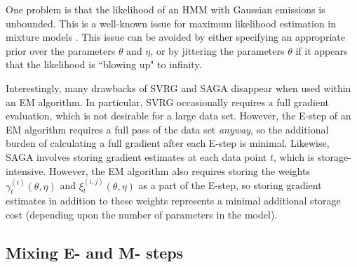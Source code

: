 One problem is that the likelihood of an HMM with Gaussian emissions is unbounded. This is a well-known issue for maximum likelihood estimation in mixture models \citep{Chen:2009,Liu:2015b}. This issue can be avoided by either specifying an appropriate prior over the parameters $\theta$ and $\eta$, or by jittering the parameters $\theta$ if it appears that the likelihood is ``blowing up" to infinity.

Interestingly, many drawbacks of SVRG and SAGA disappear when used within an EM algorithm. In particular, SVRG occasionally requires a full gradient evaluation, which is not desirable for a large data set. However, the E-step of an EM algorithm requires a full pass of the data set \textit{anyway}, so the additional burden of calculating a full gradient after each E-step is minimal. Likewise, SAGA involves storing gradient estimates at each data point $t$, which is storage-intensive. However, the EM algorithm also requires storing the weights $\gamma_t^{(i)}(\theta, \eta)$ and $\xi_t^{(i,j)}(\theta, \eta)$ as a part of the E-step, so storing gradient estimates in addition to these weights represents a minimal additional storage cost (depending upon the number of parameters in the model).



\subsection{Mixing E- and M- steps}

